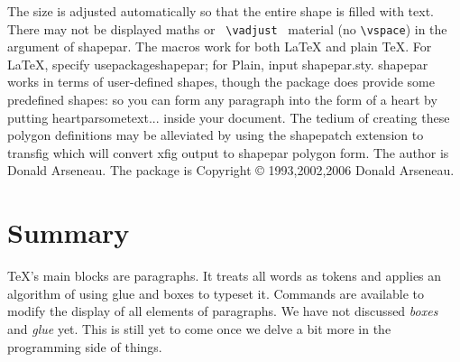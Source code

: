 The size is adjusted automatically so that the entire shape is filled with text. There may not be displayed maths or \verb+ \vadjust +  material (no \verb+\vspace+) in the argument of shapepar. The macros work for both LaTeX and plain TeX. For LaTeX, specify usepackage{shapepar}; for Plain, input shapepar.sty.
shapepar works in terms of user-defined shapes, though the package does provide some predefined shapes: so you can form any paragraph into the form of a heart by putting heartpar{sometext...} inside your document. The tedium of creating these polygon definitions may be alleviated by using the shapepatch extension to transfig which will convert xfig output to shapepar polygon form.
The author is Donald Arseneau. The package is Copyright  © 1993,2002,2006 Donald Arseneau.



\newcommand{\abc}{abcdefghijklmnopqrstuvwxyz}


\section{Summary}
TeX's main blocks are paragraphs. It treats all words as tokens and applies an algorithm of using glue and boxes to typeset it. Commands are available  to modify the display of all elements of paragraphs. We have not discussed {\em boxes} and {\em glue} yet. This is still yet to come once we delve a bit more in the programming side of things.

